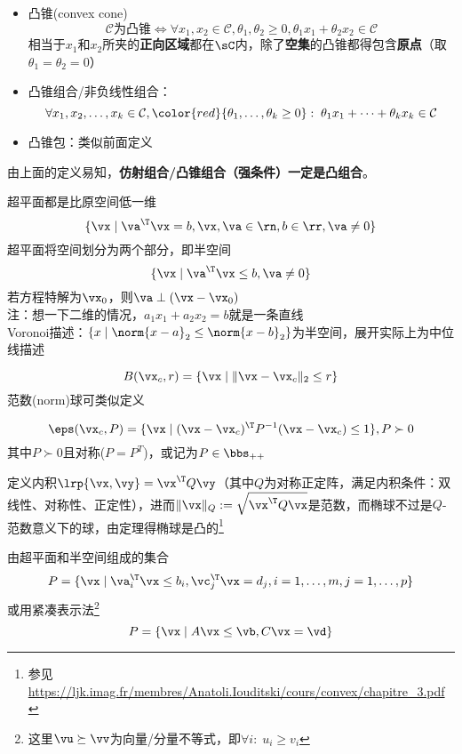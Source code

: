 \begin{definition}
\begin{itemize}
\item 凸锥(convex cone)
\[\mathcal{C}\text{为凸锥}\iff\forall x_1,x_2\in\mathcal{C},\theta_1,\theta_2\geq 0,\theta_1 x_1+\theta_2 x_2\in\mathcal{C}\]
相当于$x_1$和$x_2$所夹的\textbf{正向区域}都在$\sC$内，除了\textbf{空集}的凸锥都得包含\textbf{原点}（取$\theta_1=\theta_2=0$）
\item 凸锥组合/非负线性组合：
\[\forall x_1,x_2,\ldots,x_k\in\mathcal{C},{\color{red}{\theta_1,\ldots,\theta_k\geq 0}}:\;\theta_1 x_1+\cdots+\theta_k x_k\in\mathcal{C}\]
\item 凸锥包：类似前面定义
\end{itemize}
\end{definition}
由上面的定义易知，\textbf{仿射组合/凸锥组合（强条件）一定是凸组合}。

\begin{definition}
超平面都是比原空间低一维
\[\{\vx\mid \va^\T\vx=b,\vx,\va\in\rn,b\in\rr,\va\ne 0\}\]
超平面将空间划分为两个部分，即半空间
\[\{\vx\mid \va^\T\vx\leq b,\va\ne 0\}\]
若方程特解为$\vx_0$，则$\va\perp(\vx-\vx_0)$\\
注：想一下二维的情况，$a_1x_1+a_2x_2=b$就是一条直线\\
Voronoi描述：$\{x\mid\norm{x-a}_2\leq\norm{x-b}_2\}$为半空间，展开实际上为中位线描述
\end{definition}
\begin{definition}
\[B(\vx_c,r)=\{\vx\mid\|\vx-\vx_c\|_2\leq r\}\]
范数(norm)球可类似定义
\end{definition}
\begin{definition}[椭球(ellipsoid)]
\[\eps(\vx_c,P)=\{\vx\mid(\vx-\vx_c)^\T P^{-1}(\vx-\vx_c)\leq 1\},P\succ 0\]
其中$P\succ 0$且对称($P=P^T$)，或记为$P\in\bbs_{++}$
\end{definition}
\begin{analysis}
定义内积$\lrp{\vx,\vy}=\vx^\T Q\vy$（其中$Q$为对称正定阵，满足内积条件：双线性、对称性、正定性），进而$\|\vx\|_Q:=\sqrt{\vx^\T Q\vx}$是范数，而椭球不过是$Q$-范数意义下的球，由定理得椭球是凸的\footnote{参见\url{https://ljk.imag.fr/membres/Anatoli.Iouditski/cours/convex/chapitre_3.pdf}}
\end{analysis}
\begin{definition}
	由超平面和半空间组成的集合
\[P=\{\vx\mid\va_i^\T\vx\leq b_i,\vc_j^\T\vx=d_j,i=1,\ldots,m,j=1,\ldots,p\}\]
或用紧凑表示法\footnote{这里$\vu\succeq \vv$为向量/分量不等式，即$\forall i:\;u_i\geq v_i$}
\[P=\{\vx\mid A\vx\leq \vb,C\vx=\vd\}\]
\end{definition}
